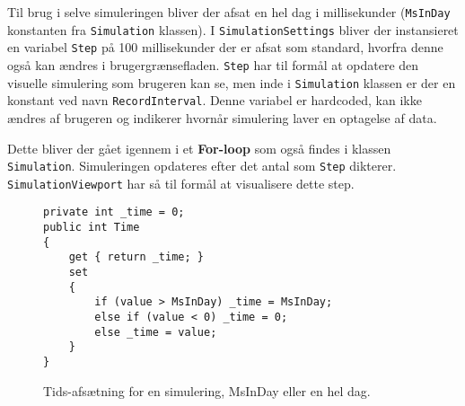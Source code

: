 Til brug i selve simuleringen bliver der afsat en hel dag i millisekunder (\texttt{MsInDay} konstanten fra \texttt{Simulation} klassen). I \texttt{SimulationSettings} bliver der instansieret en variabel \texttt{Step} på 100 millisekunder der er afsat som standard, hvorfra denne også kan ændres i brugergrænsefladen. \texttt{Step} har til formål at opdatere den visuelle simulering som brugeren kan se, men inde i \texttt{Simulation} klassen er der en konstant ved navn \texttt{RecordInterval}. Denne variabel er hardcoded, kan ikke ændres af brugeren og indikerer hvornår simulering laver en optagelse af data. 

\vspace{5mm}

Dette bliver der gået igennem i et \textbf{For-loop} som også findes i klassen \texttt{Simulation}. Simuleringen opdateres efter det antal som \texttt{Step} dikterer. \texttt{SimulationViewport} har så til formål at visualisere dette step.

\begin{figure}[H]
\begin{lstlisting}
private int _time = 0;
public int Time
{
    get { return _time; }
    set
    {
        if (value > MsInDay) _time = MsInDay;
        else if (value < 0) _time = 0;
        else _time = value;
    }
}
\end{lstlisting}
\caption{Tids-afsætning for en simulering, MsInDay eller en hel dag.}
\label{TimeForSim}
\end{figure}


